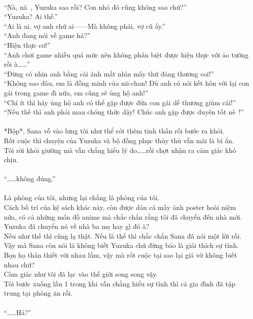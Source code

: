 \documentclass[12pt,a4paper, twosides]{book}
\begin{document}
\\
“Nà, nà~, Yuzuka sao rồi? Con nhỏ đó cũng không sao chứ?”\\
“Yuzuka? Ai thế.”\\
“Ai là ai, vợ anh chứ ai——Mà không phải, vợ cũ ấy.”\\
“Anh đang nói về game hả?”\\
“Hiện thực cơ!”\\
“Anh chơi game nhiều quá mức nên không phân biệt được hiện thực với ảo tưởng rồi à……”\\
“Đừng có nhìn anh bằng cái ánh mắt nhìn mấy thứ đáng thương coi!”\\
“Không sao đâu, em là đồng minh của nii-chan! Dù anh có nói kết hôn với lại con gái trong game đi nữa, em cũng sẽ ủng hộ anh!”\\
“Chí ít thì hãy ủng hộ anh có thể gặp được đứa con gái dễ thương giùm cái!”\\
“Nếu thế thì anh phải mau chóng thức dậy! Chúc anh gặp được duyên tốt nè~!”\\
\\
*Bộp*, Sana vỗ vào lưng tôi như thể rót thêm tinh thần rồi bước ra khỏi.\\
Rốt cuộc thì chuyện của Yuzuka và bộ đồng phục thủy thủ vẫn mãi là bí ẩn.\\
Tôi rời khỏi giường mà vẫn chẳng hiểu lý do……rồi chợt nhận ra cảm giác khó chịu.\\
\\
“……không đúng.”\\
\\
Là phòng của tôi, nhưng lại chẳng là phòng của tôi.\\
Cách bố trí của kệ sách khác này, còn được dán cả mấy ảnh poster hoài niệm nữa, có cả những món đồ anime mà chắc chắn rằng tôi đã chuyển đến nhà mới.\\
Yuzuka đã chuyển nó về nhà ba mẹ hay gì đó à?\\
Nếu như thế thì cũng lạ thật. Nếu là thế thì chắc chắn Sana đã nói một lời rồi. Vậy mà Sana còn nói là không biết Yuzuka chứ đừng bảo là giải thích sự tình.\\
Bọn họ thân thiết với nhau lắm, vậy mà rốt cuộc tại sao lại giả vờ không biết nhau chứ?\\
Cảm giác như tôi đã lạc vào thế giới song song vậy.\\
Tôi bước xuống lầu 1 trong khi vẫn chẳng hiểu sự tình thì cả gia đình đã tập trung tại phòng ăn rồi.\\
\\
“……Hả?”\\
\end{document}
